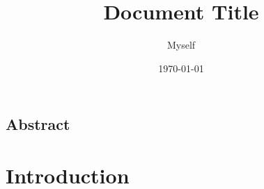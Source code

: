 \documentclass[a4paper, 12pt]{article}
\title{Document Title}
\author{Myself}
\date{\today}
\begin{document}
	
\begin{titlepage}
\maketitle
\vfill
\section*{Abstract}
\lipsum[1]
\end{titlepage}

\section{Introduction}	
\lipsum\cite{lunduke_half_2018}

\printbibliography
\end{document}
